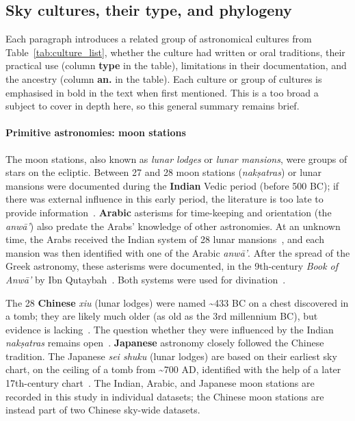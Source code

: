 \documentclass[10pt]{article}
\begin{document}

\subsection{Sky cultures, their type, and phylogeny}
\label{sec:sources-and-phylogeny}

Each paragraph introduces a related group of astronomical cultures from Table~\ref{tab:culture_list}, whether the culture had written or oral traditions, their practical use (column {\bf type} in the table),  limitations in their documentation, and the ancestry (column {\bf an.} in the table). Each culture or group of cultures is emphasised in bold in the text when first mentioned. This is a too broad a subject to cover in depth here, so this general summary remains brief.

\paragraph{Primitive astronomies: moon stations} The moon stations, also known as \emph{lunar lodges} or \emph{lunar mansions}, were groups of stars on the ecliptic. Between 27 and 28 moon stations (\emph{nak\d{s}atras}) or lunar mansions were documented during the {\bf Indian} Vedic period (before 500 BC); if there was external influence in this early period, the literature is too late to provide information~\cite{basham1954wonder}. {\bf Arabic} asterisms for time-keeping and orientation (the \emph{anw\={a}'}) also predate the Arabs' knowledge of other astronomies. At an unknown time, the Arabs received the Indian system of 28 lunar mansions~\cite{king2013islamic}, and each mansion was then identified with one of the Arabic \emph{anw\={a}'}. After the spread of the Greek astronomy, these asterisms were documented, in the 9th-century \emph{Book of Anw\={a}'} by Ibn Qutaybah~\cite{kunitzsch2013lunar}. Both systems were used for divination~\cite{kunitzsch2013lunar}. 

The 28 {\bf Chinese} \emph{xiu} (lunar lodges) were named \textasciitilde433 BC on a chest discovered in a tomb; they are likely much older (as old as the 3rd millennium BC), but evidence is lacking~\cite{stephenson2013EAmaps}. The question whether they were influenced by the Indian \emph{nak\d{s}atras} remains open~\cite{yoke2013china}. {\bf Japanese} astronomy closely followed the Chinese tradition. The Japanese \emph{sei shuku} (lunar lodges) are based on their earliest sky chart, on the ceiling of a tomb from \textasciitilde700 AD, identified with the help of a later 17th-century chart~\cite{renshaw2000cultural}. The Indian, Arabic, and Japanese moon stations are recorded in this study in individual datasets; the Chinese moon stations are instead part of two Chinese sky-wide datasets.
\end{document}
